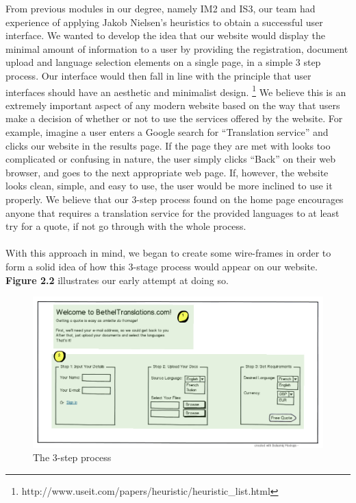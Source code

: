 \documentclass{l3proj}
\begin{document}
From previous modules in our degree, namely IM2 and IS3, our team had experience
of applying Jakob Nielsen's heuristics to obtain a successful user interface. We
wanted to develop the idea that our website would display the minimal amount of
information to a user by providing the registration, document upload and
language selection elements on a single page, in a simple 3 step process. Our
interface would then fall in line with the principle that user interfaces should
have an aesthetic and minimalist design.
\footnote{http://www.useit.com/papers/heuristic/heuristic\_list.html} We believe
this is an extremely important aspect of any modern website based on the way
that users make a decision of whether or not to use the services offered by the
website. For example, imagine a user enters a Google search for ``Translation
service'' and clicks our website in the results page. If the page they are met
with looks too complicated or confusing in nature, the user simply clicks
``Back'' on their web browser, and goes to the next appropriate web page. If,
however, the website looks clean, simple, and easy to use, the user would be
more inclined to use it properly. We believe that our 3-step process found on
the home page encourages anyone that requires a translation service for the
provided languages to at least try for a quote, if not go through with the whole
process.\\
\\
With this approach in mind, we began to create some wire-frames in order to form
a solid idea of how this 3-stage process would appear on our website.
\textbf{Figure 2.2} illustrates our early attempt at doing so.

\begin{figure}
\begin{center}
\includegraphics[width=\linewidth]{wireframes/bt-3step}
\caption{The 3-step process}
\end{center}
\end{figure}
\end{document}
